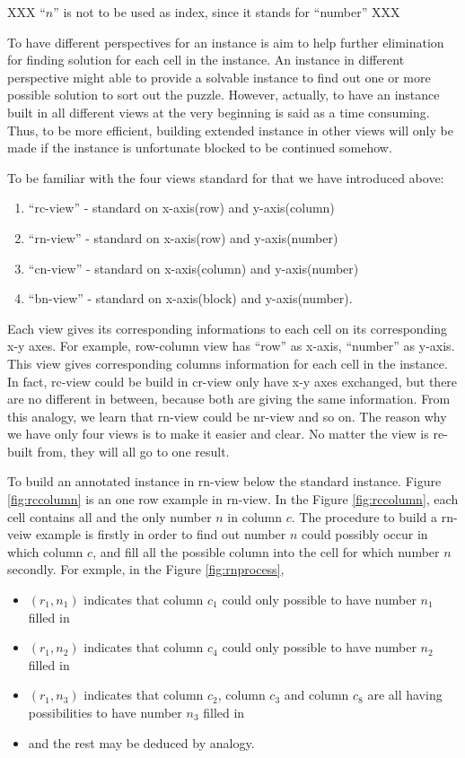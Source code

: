 \documentclass[11pt]{report}
\begin{document}
XXX ``$n$'' is not to be used as index, since it stands for ``number'' XXX


To have different perspectives for an instance is aim to help further elimination for finding solution for each cell in the instance. An instance in different perspective might able to provide a solvable instance to find out one or more possible solution to sort out the puzzle. However, actually, to have an instance built in all different views at the very beginning is said as a time consuming. Thus, to be more efficient, building extended instance in other views will only be made if the instance is unfortunate blocked to be continued somehow.

To be familiar with the four views standard for that we have introduced above:
\begin{enumerate}
\item ``rc-view'' - standard on x-axis(row) and y-axis(column)
\item ``rn-view'' - standard on x-axis(row) and y-axis(number)
\item ``cn-view'' - standard on x-axis(column) and y-axis(number)
\item ``bn-view'' - standard on x-axis(block) and y-axis(number).
\end{enumerate}

Each view gives its corresponding informations to each cell on its corresponding x-y axes. For example, row-column view has ``row'' as x-axis, ``number'' as y-axis. This view gives corresponding columns information for each cell in the instance. In fact, rc-view could be build in cr-view only have x-y axes exchanged, but there are no different in between, because both are giving the same information. From this analogy, we learn that rn-view could be nr-view and so on. The reason why we have only four views is to make it easier and clear. No matter the view is re-built from, they will all go to one result.

To build an annotated instance in rn-view below the standard instance. Figure \ref{fig:rccolumn} is an one row example in rn-view. In the Figure \ref{fig:rccolumn}, each cell contains all and the only number $n$ in column $c$. The procedure to build a rn-veiw example is firstly in order to find out number $n$ could possibly occur in which column $c$, and fill all the possible column into the cell for which number $n$ secondly. 
For exmple, in the Figure \ref{fig:rnprocess},
\begin{itemize}
\item $(r_{1}, n_{1})$ indicates that column $c_{1}$ could only possible to have number $n_{1}$ filled in
\item $(r_{1}, n_{2})$ indicates that column $c_{4}$ could only possible to have number $n_{2}$ filled in
\item $(r_{1}, n_{3})$ indicates that column $c_{2}$, column $c_{3}$ and column $c_{8}$ are all having possibilities to have number $n_{3}$ filled in
\item and the rest may be deduced by analogy.
\end{itemize}
\end{document}
